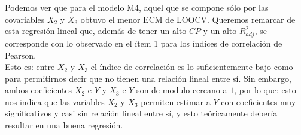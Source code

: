 Podemos ver que para el modelo M4, aquel que se compone sólo por las covariables $X_2$ y $X_3$ obtuvo el menor ECM de LOOCV. Queremos remarcar de esta regresión lineal que, además de tener un alto $CP$ y un alto $R^2_{adj}$, se corresponde con lo observado en el ítem 1 para los índices de correlación de Pearson. \\Esto es:
entre $X_2$ y $X_3$ el índice de correlación es lo suficientemente bajo como para permitirnos decir que no tienen una relación lineal entre sí. Sin embargo, ambos coeficientes $X_2$ e $Y$ y $X_3$ e $Y$ son de modulo cercano a $1$, por lo que: esto nos indica que las variables $X_2$ y $X_3$ permiten estimar a $Y$ con coeficientes muy significativos y casi sin relación lineal entre sí, y esto teóricamente debería resultar en una buena regresión.
 


